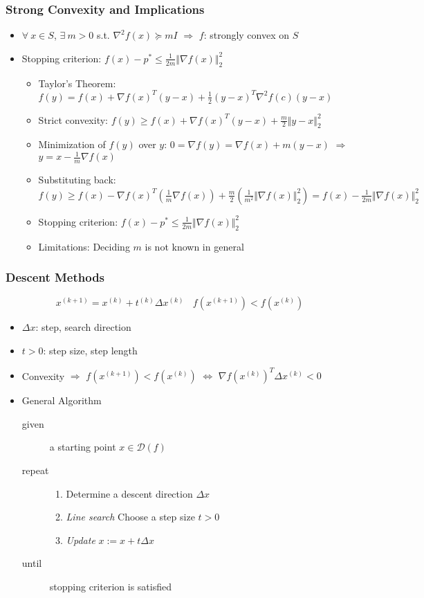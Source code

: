 \subsubsection*{Strong Convexity and Implications}
\begin{itemize}
    \item $\forall~x\in S$, $\exists~m>0$ s.t. $\nabla^2 f(x)\succeq mI$ $\Rightarrow$ $f$: strongly convex on $S$
    \item Stopping criterion: $f(x)-p^\ast\leq\frac{1}{2m}\Vert\nabla f(x)\Vert_2^2$
    \begin{itemize}
        \item Taylor's Theorem: $f(y)=f(x)+\nabla f(x)^T(y-x)+\frac{1}{2}(y-x)^T\nabla^2f(c)(y-x)$
        \item Strict convexity: $f(y)\geq f(x)+\nabla f(x)^T(y-x)+\frac{m}{2}\Vert y-x\Vert_2^2$
        \item Minimization of $f(y)$ over $y$: $0=\nabla f(y)=\nabla f(x)+m(y-x)$ $\Rightarrow$ $y=x-\frac{1}{m}\nabla f(x)$
        \item Substituting back: $f(y)\geq f(x)-\nabla f(x)^T\left(\frac{1}{m}\nabla f(x)\right)+\frac{m}{2}\left(\frac{1}{m^2}\Vert\nabla f(x)\Vert_2^2\right)=f(x)-\frac{1}{2m}\Vert\nabla f(x)\Vert_2^2$
        \item Stopping criterion: $f(x)-p^\ast\leq\frac{1}{2m}\Vert\nabla f(x)\Vert_2^2$
        \item Limitations: Deciding $m$ is not known in general
    \end{itemize}
\end{itemize}

\subsubsection*{Descent Methods}
$$ x^{(k+1)}=x^{(k)}+t^{(k)}\Delta x^{(k)}~~~~f(x^{(k+1)})<f(x^{(k)}) $$
\begin{itemize}
    \item $\Delta x$: step, search direction
    \item $t>0$: step size, step length
    \item Convexity $\Rightarrow$ $f(x^{(k+1)})<f(x^{(k)})$ $\Leftrightarrow$ $\nabla f(x^{(k)})^T\Delta x^{(k)}<0$
    \item General Algorithm
    \begin{description}
        \item[given] a starting point $x\in\mathcal{D}(f)$
        \item[repeat] \phantom{}
        \begin{enumerate}
            \item Determine a descent direction $\Delta x$
            \item \textit{Line search} Choose a step size $t>0$
            \item \textit{Update} $x:=x+t\Delta x$
        \end{enumerate}
        \item[until] stopping criterion is satisfied
    \end{description}
\end{itemize}

